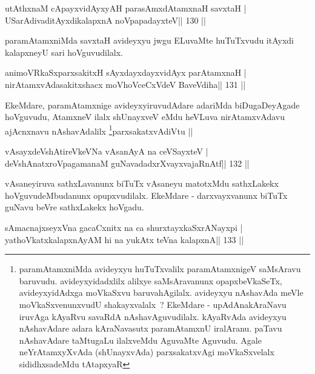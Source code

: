\begin{shl}
utAthxnaM cApayxvidAyxyAH parasAmxdAtamxnaH savxtaH |
USarAdivaditAyxdikalapxnA noVpapadayxteV\hfill || 130 ||
\end{shl}

\begin{artha}
paramAtamxniMda savxtaH avideyxyu jwgu ELuvaMte huTuTxvudu itAyxdi kalapxneyU sari hoVguvudilalx.
\end{artha}

\begin{shl}
animoVRkaSxparxsakitxH sAyxdayxdayxvidAyx parAtamxnaH |
nirAtamxvAdasakitxshacx moVhoVceCxVdeV BaveVdiha\hfill || 131 ||
\end{shl}

\begin{artha}
EkeMdare, paramAtamxnige avideyxyiruvudAdare adariMda biDugaDeyAgade
hoVguvudu, AtamxneV ilalx shUnayxveV eMdu heVLuva nirAtamxvAdavu
ajAcnxnavu nAshavAdalilx \footnote{paramAtamxniMda avideyxyu
  huTuTxvalilx paramAtamxnigeV saMsAravu baruvudu. avideyxyidadxlilx
  alilxye saMsAravanunx opapxbeVkaSeTx, avideyxyidAdxga moVkaSxvu
  baruvahAgilalx. avideyxyu nAshavAda meVle
  moVkaSxvenunxvudU shakayxvalalx~? EkeMdare - upAdAnakAraNavu
  iruvAga kAyaRvu savaRdA nAshavAguvudilalx. kAyaRvAda avideyxyu
  nAshavAdare adara kAraNavasutx paramAtamxnU iralAranu. paTavu
  nAshavAdare taMtugaLu ilalxveMdu AguvaMte Aguvudu. Agale
  neYrAtamxyXvAda (shUnayxvAda) parxsakatxvAgi moVkaSxvelalx
  sididhxsadeMdu tAtapxyaR}parxsakatxvAdiVtu ||
\end{artha}



\begin{shl}
vAsayxdeVshAtireVkeVNa vAsanAyA na ceVSayxteV |
deVshAnatxroVpagamanaM guNavadadxrXvayxvajaRnAtf\hfill || 132 ||
\end{shl}

\begin{artha}
vAsaneyiruva sathxLavanunx biTuTx vAsaneyu matotxMdu sathxLakekx hoVguvudeMbudanunx opupxvudilalx. EkeMdare - darxvayxvanunx biTuTx guNavu beVre sathxLakekx hoVgadu.
\end{artha}

\begin{shl}
sAmacnajxseyxVna gacaCxnitx na ca shurxtayxkaSxrANayxpi |
yathoVkatxkalapxnAyAM hi na yukAtx teVna kalapxnA\hfill || 133 ||
\end{shl}


